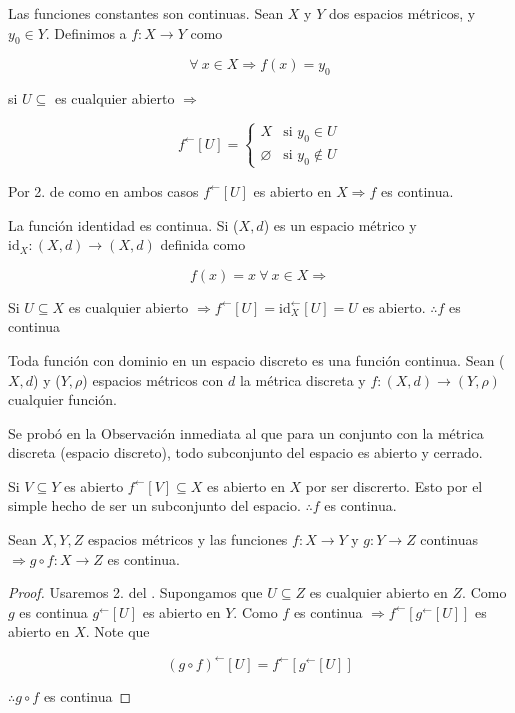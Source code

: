 \begin{eg}
    Las funciones constantes son continuas. Sean $X$ y $Y$ dos espacios métricos, y $y_0 \in Y$. Definimos a $f: X \to Y$ como 

    $$\forall \: x \in X \Rightarrow f(x) = y_0$$

    si $U \subseteq$ es cualquier abierto $\Rightarrow$

    $$f^\leftarrow[U] = \begin{cases}
             X & \text{si } y_0 \in U\\
             \varnothing & \text{si } y_0 \notin U
     \end{cases} $$

    Por 2. de  como en ambos casos $f^\leftarrow[U]$ es abierto en $X \Rightarrow f$ es continua.
\end{eg}

\begin{eg}
    La función identidad es continua. Si ($X,d$) es un espacio métrico y ${\mathrm{id}}_{X} : (X,d) \to (X,d) $
    definida como 

    $$ f(x) = x \: \forall \: x \in X \Rightarrow$$

    Si $U \subseteq X$ es cualquier abierto $\Rightarrow f^\leftarrow[U] = {\mathrm{id}}_{X}^\leftarrow[U] = U$ es abierto. $\therefore f$ es continua
\end{eg}

\begin{eg}
    Toda función con dominio en un espacio discreto es una función continua. Sean ($X,d$) y ($Y,\rho$) espacios métricos con $d$ la métrica discreta y $f: (X,d) \to (Y,\rho)$ cualquier función.

    Se probó en la Observación inmediata al  que para un conjunto con la métrica discreta (espacio discreto), todo subconjunto del espacio es abierto y cerrado.

    Si $V \subseteq Y$ es abierto $f^\leftarrow[V] \subseteq X$ es abierto en $X$ por ser discrerto. Esto por el simple hecho de ser un subconjunto del espacio. $\therefore f$ es continua. 
\end{eg}

\begin{theorem}
    Sean $X,Y,Z$ espacios métricos y las funciones $f : X \to Y$ y $g : Y \to Z$ continuas $\Rightarrow g \circ f : X \to Z$ es continua.
\end{theorem}

\begin{proof}
    Usaremos 2. del . Supongamos que $U \subseteq Z$ es cualquier abierto en $Z$. Como $g$ es continua $g^\leftarrow[U]$ es abierto en $Y$. Como $f$ es continua $\Rightarrow f^\leftarrow[g^\leftarrow[U]]$ es abierto en $X$. Note que

    $$(g \circ f)^\leftarrow[U] = f^\leftarrow[g^\leftarrow[U]]$$

    $\therefore g \circ f$ es continua
\end{proof}

